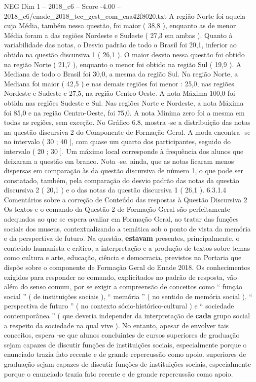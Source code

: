 \begin{textsample}{NEG Dim 1 – 2018\_c6 – Score -4.00 – 2018\_c6/enade\_2018\_tec\_gest\_com\_caa42f8020.txt}
A região Norte foi aquela cuja Média, também nessa questão, foi maior ( 38,8 ), enquanto as de menor Média foram a das regiões Nordeste e Sudeste ( 27,3 em ambas ).
Quanto à variabilidade das notas, o Desvio padrão de todo o Brasil foi 20,1, inferior ao obtido na questão discursiva 1 ( 26,1 ).
O maior desvio nessa questão foi obtido na região Norte ( 21,7 ), enquanto o menor foi obtido na região Sul ( 19,9 ).
A Mediana de todo o Brasil foi 30,0, a mesma da região Sul.
Na região Norte, a Mediana foi maior ( 42,5 ) e nas demais regiões foi menor : 25,0, nas regiões Nordeste e Sudeste e 27,5, na região Centro-Oeste.
A nota Máxima 100,0 foi obtida nas regiões Sudeste e Sul.
Nas regiões Norte e Nordeste, a nota Máxima foi 85,0 e na região Centro-Oeste, foi 75,0.
A nota Mínima zero foi a mesma em todas as regiões, sem exceção.
No Gráfico 6.8, mostra -se a distribuição das notas na questão discursiva 2 do Componente de Formação Geral.
A moda encontra -se no intervalo ( 30 ; 40 ], com quase um quarto dos participantes, seguido do intervalo ( 20 ; 30 ].
Um máximo local corresponde à frequência dos alunos que deixaram a questão em branco.
Nota -se, ainda, que as notas ficaram menos dispersas em comparação às da questão discursiva de número 1, o que pode ser constatado, também, pela comparação do desvio padrão das notas da questão discursiva 2 ( 20,1 ) e o das notas da questão discursiva 1 ( 26,1 ). 6.3.1.4 Comentários sobre a correção de Conteúdo das respostas à Questão Discursiva 2 Os textos e o comando da Questão 2 de Formação Geral são perfeitamente adequados ao que se espera avaliar em Formação Geral, ao tratar das funções sociais dos museus, contextualizando a temática sob o ponto de vista da memória e da perspectiva de futuro.
Na questão, \textbf{estavam} presentes, principalmente, o conteúdo humanista e crítico, a interpretação e a produção de textos sobre temas como cultura e arte, educação, ciência e democracia, previstos na Portaria que dispõe sobre o componente de Formação Geral do Enade 2018.
Os conhecimentos exigidos para responder ao comando, explicitados no padrão de resposta, vão além do senso comum, por se exigir a compreensão de conceitos como “ função social ” ( de instituições sociais ), “ memória ” ( no sentido de memória social ), “ perspectiva de futuro ” ( no contexto sócio-histórico-cultural ) e “ sociedade contemporânea ” ( que deveria independer da interpretação de \textbf{cada} grupo social a respeito da sociedade na qual vive ).
No entanto, apesar de envolver tais conceitos, espera -se que alunos concluintes de cursos superiores de graduação sejam capazes de discutir funções de instituições sociais, especialmente porque o enunciado trazia fato recente e de grande repercussão como apoio. superiores de graduação sejam capazes de discutir funções de instituições sociais, especialmente porque o enunciado trazia fato recente e de grande repercussão como apoio.

\end{textsample}

